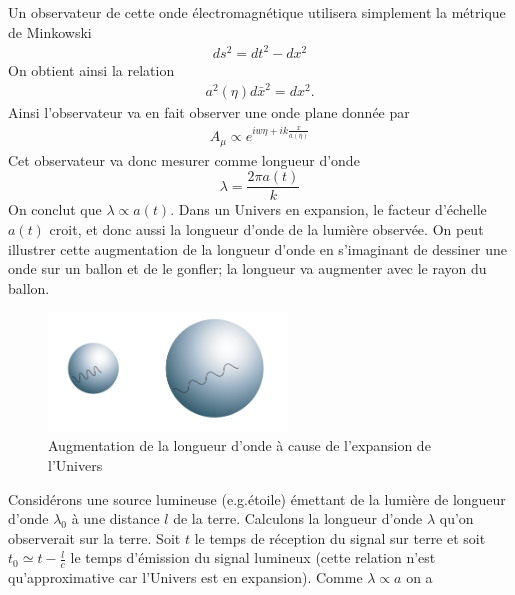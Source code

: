 \documentclass[a4paper,12pt]{report}
\theoremstyle{plain}
\theoremstyle{plain}
\begin{document}
      	Un observateur de cette onde \'electromagn\'etique utilisera simplement la m\'etrique de Minkowski
      	\begin{eqnarray}
      	ds^2=dt^2-dx^2
      	\end{eqnarray}
      	On obtient ainsi la relation 
      	\begin{eqnarray}
      	a^2\left(\eta \right)d\bar{x}^2=dx^2. 
      	\end{eqnarray}
      	Ainsi l'observateur va en fait observer une onde plane donn\'ee par
      	\begin{eqnarray}
      	A_\mu \propto e^{iw\eta +ik\frac{x}{a\left(\eta \right) }}
      	\end{eqnarray}
      	Cet observateur va donc mesurer comme longueur d'onde 
      	\begin{equation}
      	\lambda = \frac{2\pi a\left(t \right) }{k}
      	\end{equation}
      	On conclut que $\lambda\propto a\left( t \right) $. Dans un Univers en expansion, le facteur d'\'echelle $a \left(t \right)$ croit, et donc aussi la longueur d'onde de la lumi\`ere observ\'ee. On peut illustrer cette augmentation de la longueur d'onde en s'imaginant de dessiner une onde sur un ballon et de le gonfler; la longueur va augmenter  avec le rayon du ballon.	
\begin{figure}[h]
\includegraphics[width=15pc]{t2.png}
\caption{Augmentation de la longueur d'onde \`a cause de l'expansion de l'Univers}
\end{figure}
      	\qquad Consid\'erons une source lumineuse (e.g.\'etoile) \'emettant de la lumi\`ere de longueur d'onde $\lambda_0$ \`a une distance $l$ de la terre. Calculons la longueur d'onde $\lambda$ qu'on observerait sur la terre. Soit $t$ le temps de r\'eception du signal sur terre et soit $t_0\simeq t-\frac{l}{c}$ le temps d'\'emission du signal lumineux (cette relation n'est qu'approximative car l'Univers est en expansion). Comme $\lambda \propto a$ on a 
\end{document}
